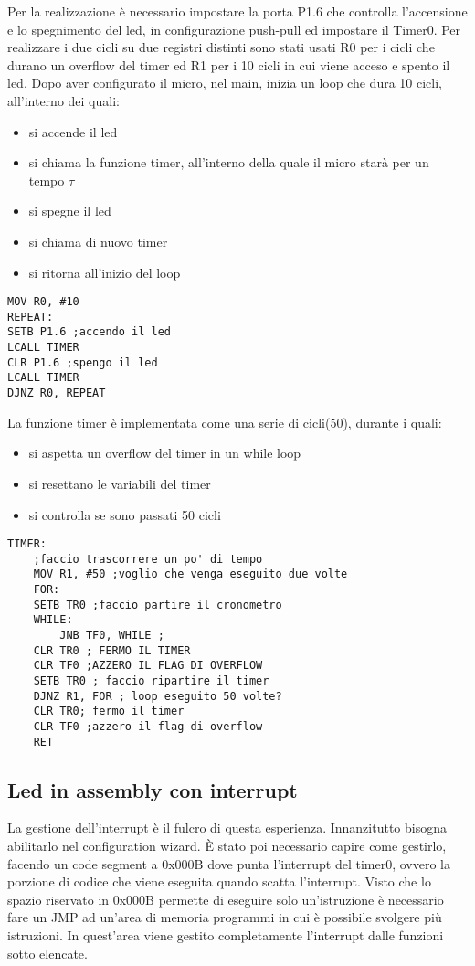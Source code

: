 \documentclass[main.tex]{subfiles}
\begin{document}
Per la realizzazione è necessario impostare la porta P1.6 che controlla l’accensione e lo spegnimento del led, in configurazione push-pull ed impostare il Timer0.
Per realizzare i due cicli su due registri distinti sono stati usati R0 per i cicli che durano un overflow del timer ed R1 per i 10 cicli in cui viene acceso e spento il led. 
Dopo aver configurato il micro, nel main, inizia un loop che dura 10 cicli, all'interno dei quali:
\begin{itemize}
    \item si accende il led
    \item si chiama la funzione timer, all'interno della quale il micro starà per un tempo $\tau$
    \item si spegne il led
    \item si chiama di nuovo timer
    \item si ritorna all'inizio del loop
\end{itemize}
\begin{lstlisting}[caption=Main del programma]
MOV R0, #10
REPEAT:
SETB P1.6 ;accendo il led
LCALL TIMER
CLR P1.6 ;spengo il led
LCALL TIMER
DJNZ R0, REPEAT
\end{lstlisting}
La funzione timer è implementata come una serie di cicli(50), durante i quali:
\begin{itemize}
    \item si aspetta un overflow del timer in un while loop
    \item si resettano le variabili del timer
    \item si controlla se sono passati 50 cicli
\end{itemize}
\begin{lstlisting}[caption=Funzione timer]
TIMER:
	;faccio trascorrere un po' di tempo
	MOV R1, #50 ;voglio che venga eseguito due volte
	FOR:
	SETB TR0 ;faccio partire il cronometro
	WHILE:
		JNB TF0, WHILE ;
	CLR TR0 ; FERMO IL TIMER
	CLR TF0 ;AZZERO IL FLAG DI OVERFLOW
	SETB TR0 ; faccio ripartire il timer
	DJNZ R1, FOR ; loop eseguito 50 volte?
	CLR TR0; fermo il timer
	CLR TF0 ;azzero il flag di overflow
	RET
\end{lstlisting}


\subsection{Led in assembly con interrupt}

La gestione dell'interrupt è il fulcro di questa esperienza. Innanzitutto bisogna abilitarlo nel configuration wizard. È stato poi necessario capire come gestirlo, facendo un code segment a 0x000B dove punta l'interrupt del timer0, ovvero la porzione di codice che viene eseguita quando scatta l'interrupt. Visto che lo spazio riservato in 0x000B permette di eseguire solo un'istruzione è necessario fare un JMP ad un'area di memoria programmi in cui è possibile svolgere più istruzioni. In quest'area viene gestito completamente l'interrupt dalle funzioni sotto elencate.
\end{document}
